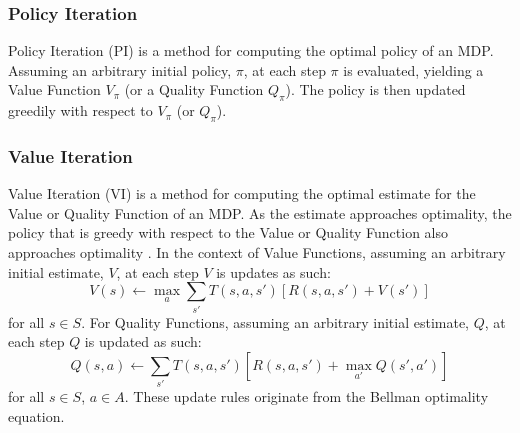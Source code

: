 \subsubsection{Policy Iteration}
Policy Iteration (PI) \citep{Bellman:1957, howard:dp} is a method for computing the optimal policy of an MDP. Assuming an arbitrary initial policy, $\pi$, at each step $\pi$ is evaluated, yielding a Value Function $V_\pi$ (or a Quality Function $Q_\pi$). The policy is then updated greedily with respect to $V_\pi$ (or $Q_\pi$).
\subsubsection{Value Iteration}
Value Iteration (VI) \cite{Bellman:1957} is a method for computing the optimal estimate for the Value or Quality Function of an MDP. As the estimate approaches optimality, the policy that is greedy with respect to the Value or Quality Function also approaches optimality \citep{series/synthesis/2010Szepesvari}.
In the context of Value Functions, assuming an arbitrary initial estimate, $V$, at each step $V$ is updates as such:
\begin{equation}
\label{eqn:vupdate}
V(s) \leftarrow \max_a\sum_{s'}T(s, a, s')[R(s, a, s')+V(s')]
\end{equation}
for all $s \in S$.
For Quality Functions, assuming an arbitrary initial estimate, $Q$, at each step $Q$ is updated as such:
\begin{equation}
\label{eqn:qupdate}
Q(s,a) \leftarrow \sum_{s'}T(s,a,s')[R(s,a,s') + \max_{a'}Q(s',a')]
\end{equation}
for all $s \in S$, $a \in A$. These update rules originate from the Bellman optimality equation.
